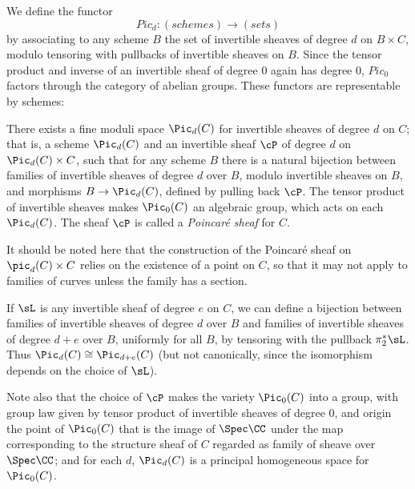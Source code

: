  

 

We define the functor
 $$
 Pic_d : (schemes) \to (sets)
 $$
 by associating to any scheme $B$ the set of invertible sheaves of degree $d$ on $B \times C$, modulo tensoring with pullbacks of invertible sheaves on $B$. Since the tensor product and inverse of an invertible sheaf of degree 0 again has degree 0, 
 $Pic_0$ factors through the category of abelian groups. These functors are representable by schemes:
  
 \begin{fact}\cite[Theorem 9.4.8]{Kleiman-PicardScheme}
 There exists a fine moduli space $\Pic_d(C)$ for invertible sheaves of degree $d$ on $C$; that is, a scheme $\Pic_d(C)$ and an invertible sheaf $\cP$ of degree $d$ on $\Pic_d(C) \times C$, such that for any scheme $B$ there is a natural bijection between families of invertible sheaves of degree $d$ over $B$, modulo invertible sheaves on $B$, and morphisms $B \to \Pic_d(C)$, defined by pulling back $\cP$. The tensor product of invertible sheaves makes $\Pic_0(C)$ an algebraic group, which acts on each $\Pic_d(C)$. The sheaf $\cP$ is called a \emph{Poincar\'e sheaf} for $C$.
 \end{fact}
 
 It should be noted here that the construction of the Poincar\'e sheaf on $\pic_d(C) \times C$ relies on the existence of a point on $C$, so that it may not apply to families of curves unless the family has a section.
 
If $\sL$ is any invertible sheaf of degree $e$ on $C$, we can define a bijection between families of invertible sheaves of degree $d$ over $B$ and families of invertible sheaves of degree $d+e$ over $B$, uniformly for all $B$, by tensoring with the pullback $\pi_2^*\sL$. Thus $\Pic_d(C) \cong \Pic_{d+e}(C)$ (but not canonically, since the isomorphism depends on the choice of $\sL$).
 
 Note also that the choice of $\cP$ makes the variety $\Pic_0(C)$ into a group, with group law given by tensor product of invertible sheaves of degree 0, and origin the point of $\Pic_0(C)$ that is the
 image of $\Spec \CC$ under the map corresponding to the structure sheaf of $C$ regarded
 as family of sheave over $\Spec \CC$; and for each $d$, $\Pic_d(C)$ is a principal homogeneous space for $\Pic_0(C)$. 
 
